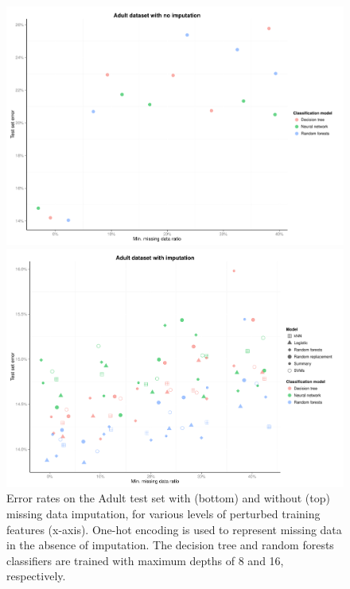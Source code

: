 \documentclass[10pt]{book}
\theoremstyle{definition}
\begin{document}
\begin{figure}[h!]
\includegraphics [scale=0.45]{figure/test-errors-adult-no-imp.pdf}\par
\includegraphics [scale=0.45]{figure/test-errors-adult-imp.pdf}\par
   \caption{\footnotesize Error rates on the Adult test set with (bottom) and without (top) missing data imputation, for various levels of perturbed training features (x-axis). One-hot encoding is used to represent missing data in the absence of imputation. The decision tree and random forests classifiers are trained with maximum depths of 8 and 16, respectively.}
   \label{fig:test-error-adult}
\end{figure}
\end{document}
